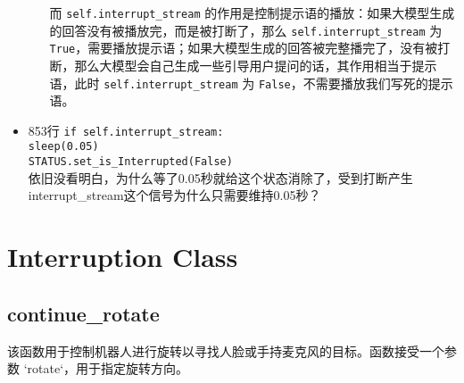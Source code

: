 \documentclass[]{article}
\begin{document}
\begin{itemize}
\begin{itemize}
		而 \texttt{self.interrupt\_stream} 的作用是控制提示语的播放：如果大模型生成的回答没有被播放完，而是被打断了，那么 \texttt{self.interrupt\_stream} 为 \texttt{True}，需要播放提示语；如果大模型生成的回答被完整播完了，没有被打断，那么大模型会自己生成一些引导用户提问的话，其作用相当于提示语，此时 \texttt{self.interrupt\_stream} 为 \texttt{False}，不需要播放我们写死的提示语。
	\end{itemize}
	\item 853行 \texttt{if self.interrupt\_stream:}\\
	\texttt{sleep(0.05)}\\
	\texttt{STATUS.set\_is\_Interrupted(False)}\\
	\textcolor{mycolor}{依旧没看明白，为什么等了0.05秒就给这个状态消除了，受到打断产生interrupt\_stream这个信号为什么只需要维持0.05秒？}
\end{itemize}
\section{Interruption Class}
\subsection{continue\_rotate}
该函数用于控制机器人进行旋转以寻找人脸或手持麦克风的目标。函数接受一个参数 `rotate`，用于指定旋转方向。
\end{document}
